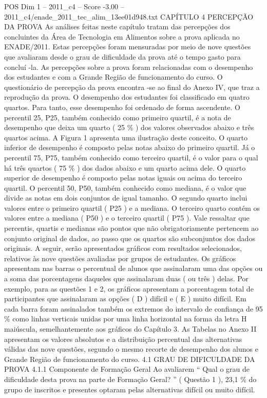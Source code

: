 \begin{textsample}{POS Dim 1 – 2011\_c4 – Score -3.00 – 2011\_c4/enade\_2011\_tec\_alim\_13ee01d948.txt}  \label{ex:f1_pos_326}
CAPÍTULO 4 PERCEPÇÃO DA PROVA As análises feitas neste capítulo tratam das percepções dos concluintes da Área de Tecnologia em Alimentos sobre a prova aplicada no ENADE/2011.
Estas percepções foram mensuradas por meio de nove questões que avaliaram desde o grau de dificuldade da prova até o tempo gasto para concluí -la.
As percepções sobre a prova foram relacionadas com o desempenho dos estudantes e com a Grande Região de funcionamento do curso.
O questionário de percepção da prova encontra -se ao final do Anexo IV, que traz a reprodução da prova.
O desempenho dos estudantes foi classificado em quatro quartos.
Para tanto, esse desempenho foi ordenado de forma ascendente.
O percentil 25, P25, também conhecido como primeiro quartil, é a nota de desempenho que deixa um quarto ( 25 \% ) dos valores observados abaixo e três quartos acima.
A Figura 1 apresenta uma ilustração deste conceito.
O quarto inferior de desempenho é composto pelas notas abaixo do primeiro quartil.
Já o percentil 75, P75, também conhecido como terceiro quartil, é o valor para o qual há três quartos ( 75 \% ) dos dados abaixo e um quarto acima dele.
O quarto superior de desempenho é composto pelas notas iguais ou acima do terceiro quartil.
O percentil 50, P50, também conhecido como mediana, é o valor que divide as notas em dois conjuntos de igual tamanho.
O segundo quarto inclui valores entre o primeiro quartil ( P25 ) e a mediana.
O terceiro quarto contém os valores entre a mediana ( P50 ) e o terceiro quartil ( P75 ).
Vale ressaltar que percentis, quartis e medianas são pontos que não obrigatoriamente pertencem ao conjunto original de dados, ao passo que os quartos são subconjuntos dos dados originais.
A seguir, serão apresentados gráficos com resultados selecionados, relativos às nove questões avaliadas por grupos de estudantes.
Os gráficos apresentam nas barras o percentual de alunos que assinalaram uma das opções ou a soma das porcentagens daqueles que assinalaram duas ( ou três ) delas.
Por exemplo, para as questões 1 e 2, os gráficos apresentam a porcentagem total de participantes que assinalaram as opções ( D ) difícil e ( E ) muito difícil.
Em cada barra foram assinalados também os extremos do intervalo de confiança de 95 \% como linhas verticais unidas por uma linha horizontal na forma da letra H maiúscula, semelhantemente aos gráficos do Capítulo 3.
As Tabelas no Anexo II apresentam os valores absolutos e a distribuição percentual das alternativas válidas das nove questões, segundo o mesmo recorte de desempenho dos alunos e Grande Região de funcionamento do curso. 4.1 GRAU DE DIFICULDADE DA PROVA 4.1.1 Componente de Formação Geral Ao avaliarem “ Qual o grau de dificuldade desta prova na parte de Formação Geral? ” ( Questão 1 ), 23,1 \% do grupo de inscritos e presentes optaram pelas alternativas difícil ou muito difícil.

\end{textsample}
